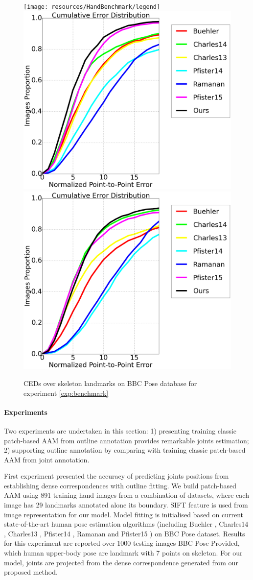 \begin{figure}[b!]
    \centering
    \texttt{[image: resources/HandBenchmark/legend]}
    \\
    \includegraphics[width=0.48\columnwidth]{resources/HandBenchmark/wrist}
    \includegraphics[width=0.48\columnwidth]{resources/HandBenchmark/elbow}
    \caption{CEDs over skeleton landmarks on BBC Pose database for experiment \ref{exp:benchmark}}
    \label{fig:hand_benchmark}
\end{figure}

\paragraph{Experiments} Two experiments are undertaken in this section: 1) presenting training classic patch-based AAM from outline annotation provides remarkable joints estimation; 2) supporting outline annotation by comparing with training classic patch-based AAM from joint annotation.

First experiment presented the accuracy of predicting joints positions from establishing dense correspondences with outline fitting. We build patch-based AAM using 891 training hand images from a combination of datasets, where each image has 29 landmarks annotated alone its boundary. SIFT \cite{PoseletsICCV09} feature is used from image representation for our model. Model fitting is initialised based on current state-of-the-art human pose estimation algorithms (including Buehler \cite{buehler2011upper}, Charles14 \cite{charles2014upper}, Charles13 \cite{charles2013domain}, Pfister14 \cite{pfister2015deep}, Ramanan \cite{yang2013articulated} and Pfister15 \cite{pfister2015flowing}) on BBC Pose \cite{pfister2015flowing} dataset. Results for this experiment are reported over 1000 testing images BBC Pose Provided, which human upper-body pose are landmark with 7 points on skeleton. For our model, joints are projected from the dense correspondence generated from our proposed method.

